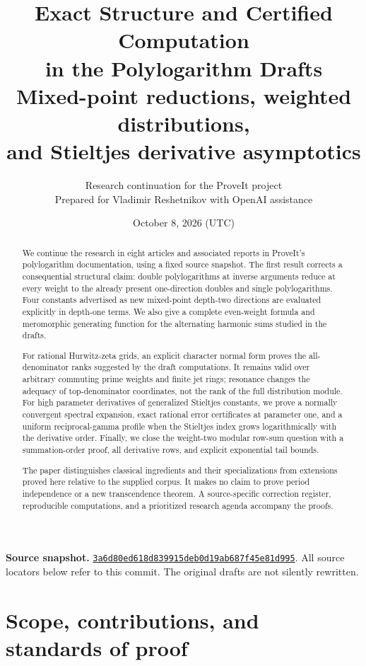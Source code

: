 \documentclass[11pt]{article}
\title{\color{ink}\textbf{Exact Structure and Certified Computation\\
in the Polylogarithm Drafts}\\[0.6em]
\large Mixed-point reductions, weighted distributions,\\
and Stieltjes derivative asymptotics}
\author{Research continuation for the ProveIt project\\
\small Prepared for Vladimir Reshetnikov with OpenAI assistance}
\date{October 8, 2026 (UTC)}
\theoremstyle{definition}
\theoremstyle{remark}
\begin{document}
\maketitle
\begin{abstract}
We continue the research in eight articles and associated reports in
ProveIt's polylogarithm documentation, using a fixed source snapshot.
The first result corrects a consequential structural claim: double
polylogarithms at inverse arguments reduce at every weight to the
already present one-direction doubles and single polylogarithms.
Four constants advertised as new mixed-point depth-two directions are
evaluated explicitly in depth-one terms. We also give a complete
even-weight formula and meromorphic generating function for the
alternating harmonic sums studied in the drafts.

For rational Hurwitz-zeta grids, an explicit character normal form proves
the all-denominator ranks suggested by the draft computations.
It remains valid over arbitrary commuting prime weights and finite jet
rings; resonance changes the adequacy of top-denominator coordinates,
not the rank of the full distribution module. For high parameter
derivatives of generalized Stieltjes constants, we prove a normally
convergent spectral expansion, exact rational error certificates at
parameter one, and a uniform reciprocal-gamma profile when the
Stieltjes index grows logarithmically with the derivative order.
Finally, we close the weight-two modular row-sum question with a
summation-order proof, all derivative rows, and explicit exponential
tail bounds.

The paper distinguishes classical ingredients and their specializations
from extensions proved here relative to the supplied corpus. It makes
no claim to prove period independence or a new transcendence theorem.
A source-specific correction register, reproducible computations, and
a prioritized research agenda accompany the proofs.
\end{abstract}
\vspace{0.5em}
\noindent\textbf{Source snapshot.}
\href{https://github.com/VladimirReshetnikov/ProveIt/commit/3a6d80ed618d839915deb0d19ab687f45e81d995}
{\texttt{3a6d80ed618d839915deb0d19ab687f45e81d995}}.
All source locators below refer to this commit. The original drafts
are not silently rewritten.
\clearpage
\tableofcontents
\clearpage
\section{Scope, contributions, and standards of proof}\label{sec:scope}
\end{document}
